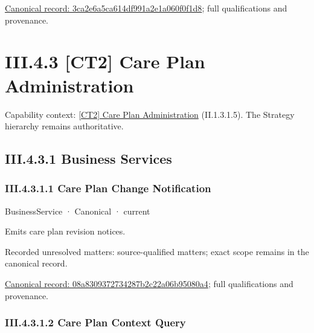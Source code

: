 {\footnotesize \href{../../../../continuum/business/business-function/3ca2e6a5ca614df991a2e1a060f0f1d8.md}{Canonical record: 3ca2e6a5ca614df991a2e1a060f0f1d8}; full qualifications and provenance.}\par
\section*{III.4.3 [CT2] Care Plan Administration}
\label{navigation:III.4.3}

{\small Capability context: \hyperref[element:cf06eec5699f406fa30a00d2f76e3098]{[CT2] Care Plan Administration} (II.1.3.1.5). The Strategy hierarchy remains authoritative.}\par
\subsection*{III.4.3.1 Business Services}
\label{navigation:III.4.3.1}

\subsubsection*{III.4.3.1.1 Care Plan Change Notification}
\label{navigation:III.4.3.1.1}

\label{element:08a8309372734287b2c22a06b95080a4}
{\small BusinessService · Canonical · current}\par

Emits care plan revision notices.


{\small Recorded unresolved matters: source-qualified matters; exact scope remains in the canonical record.}\par
{\footnotesize \href{../../../../continuum/business/business-service/08a8309372734287b2c22a06b95080a4.md}{Canonical record: 08a8309372734287b2c22a06b95080a4}; full qualifications and provenance.}\par
\subsubsection*{III.4.3.1.2 Care Plan Context Query}
\label{navigation:III.4.3.1.2}

